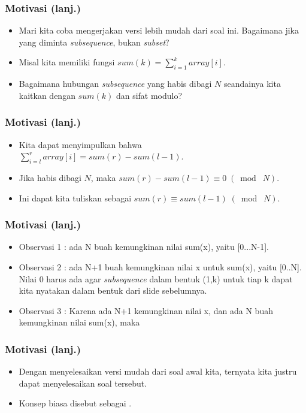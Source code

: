 \begin{frame}
\frametitle{Motivasi (lanj.)}
\begin{itemize}
  \item Mari kita coba mengerjakan versi lebih mudah dari soal ini. Bagaimana jika yang diminta \textit{subsequence}, bukan \textit{subset}?
  \item Misal kita memiliki fungsi $sum(k) = \sum\limits_{i=1}^k array[i]$.
  \item Bagaimana hubungan \textit{subsequence} yang habis dibagi $N$ seandainya kita kaitkan dengan $sum(k)$ dan sifat modulo?
\end{itemize}
\end{frame}

\begin{frame}
\frametitle{Motivasi (lanj.)}
\begin{itemize}
  \item Kita dapat menyimpulkan bahwa $\sum\limits_{i=l}^r array[i] = sum(r) - sum(l - 1)$.
  \item Jika habis dibagi $N$, maka $sum(r) - sum(l - 1) \equiv 0 \; (\bmod \; N)$.
  \item Ini dapat kita tuliskan sebagai $sum(r) \equiv sum(l - 1) \;(\bmod\; N)$.
\end{itemize}
\end{frame}

\begin{frame}
\frametitle{Motivasi (lanj.)}
\begin{itemize}
  \item Observasi 1 : ada N buah kemungkinan nilai sum(x), yaitu [0...N-1].
  \item Observasi 2 : ada N+1 buah kemungkinan nilai x untuk sum(x), yaitu [0..N]. Nilai 0 harus ada agar \textit{subsequence} dalam bentuk (1,k) untuk tiap k dapat kita nyatakan dalam bentuk dari slide sebelumnya.
  \item Observasi 3 : Karena ada N+1 kemungkinan nilai x, dan ada N buah kemungkinan nilai sum(x), maka  
\end{itemize}
\end{frame}

\begin{frame}
\frametitle{Motivasi (lanj.)}
\begin{itemize}
  \item Dengan menyelesaikan versi mudah dari soal awal kita, ternyata kita justru dapat menyelesaikan soal tersebut.
  \item Konsep  biasa disebut sebagai .
\end{itemize}
\end{frame}

